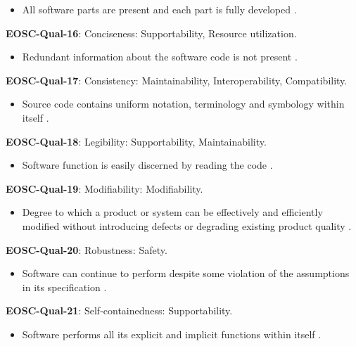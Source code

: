 \begin{itemize}
    \item All software parts are present and each part is fully developed \cite{iso_25010_2011_2017,boehm_quantitative_1976}.
\end{itemize}

\textbf{EOSC-Qual-16}: Conciseness: Supportability, Resource utilization.

\begin{itemize}
    \item Redundant information about the software code is not present \cite{boehm_quantitative_1976}.
\end{itemize}

\textbf{EOSC-Qual-17}: Consistency: Maintainability, Interoperability, Compatibility.

\begin{itemize}
    \item Source code contains uniform notation, terminology and symbology within itself \cite{boehm_quantitative_1976,raymond_software_2013}.
\end{itemize}

\textbf{EOSC-Qual-18}: Legibility: Supportability, Maintainability.

\begin{itemize}
    \item Software function is easily discerned by reading the code \cite{boehm_quantitative_1976}.
\end{itemize}

\textbf{EOSC-Qual-19}: Modifiability: Modifiability.

\begin{itemize}
    \item Degree to which a product or system can be effectively and efficiently modified without introducing defects or degrading existing product quality \cite{iso_25010_2011_2017,boehm_quantitative_1976}.
\end{itemize}

\textbf{EOSC-Qual-20}: Robustness: Safety.

\begin{itemize}
    \item Software can continue to perform despite some violation of the assumptions in its specification \cite{boehm_quantitative_1976}.
\end{itemize}

\textbf{EOSC-Qual-21}: Self-containedness: Supportability.

\begin{itemize}
    \item Software performs all its explicit and implicit functions within itself \cite{boehm_quantitative_1976}.
\end{itemize}

